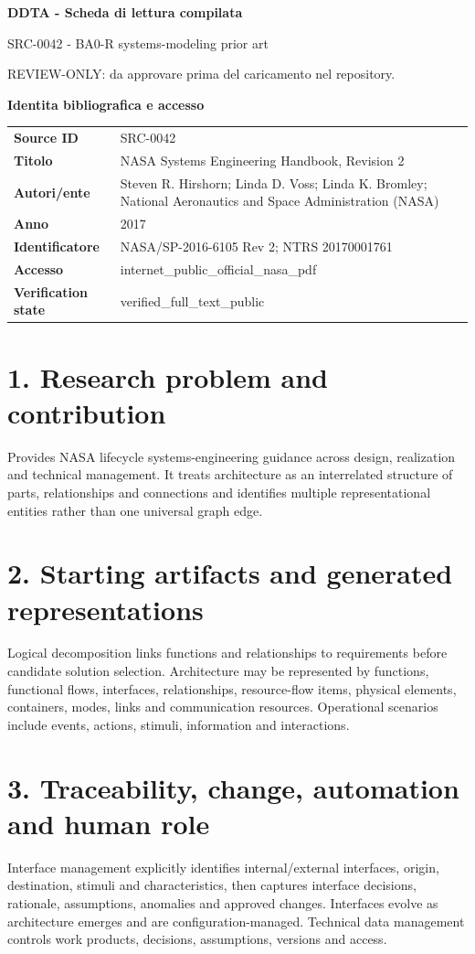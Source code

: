 \documentclass[10pt,a4paper]{article}
\newenvironment{factbox}[1]{\def\FrameCommand{\fcolorbox{ddtablue}{ddtagray}}\MakeFramed{\advance\hsize-2\width\FrameRestore}\noindent\textbf{#1}\par\smallskip}{\endMakeFramed}
\begin{document}
\begin{center}
{\LARGE\bfseries DDTA - Scheda di lettura compilata}\par
{\large SRC-0042 - BA0-R systems-modeling prior art}\par
{\small REVIEW-ONLY: da approvare prima del caricamento nel repository.}\par
\end{center}
\begin{factbox}{Identita bibliografica e accesso}
\begin{tabularx}{\linewidth}{>{\bfseries}p{3.4cm}X}
Source ID & SRC-0042\\
Titolo & NASA Systems Engineering Handbook, Revision 2\\
Autori/ente & Steven R. Hirshorn; Linda D. Voss; Linda K. Bromley; National Aeronautics and Space Administration (NASA)\\
Anno & 2017\\
Identificatore & NASA/SP-2016-6105 Rev 2; NTRS 20170001761\\
Accesso & internet\_public\_official\_nasa\_pdf\\
Verification state & verified\_full\_text\_public\\
\end{tabularx}
\end{factbox}
\section{1. Research problem and contribution}
Provides NASA lifecycle systems-engineering guidance across design, realization and technical management. It treats architecture as an interrelated structure of parts, relationships and connections and identifies multiple representational entities rather than one universal graph edge.
\section{2. Starting artifacts and generated representations}
Logical decomposition links functions and relationships to requirements before candidate solution selection. Architecture may be represented by functions, functional flows, interfaces, relationships, resource-flow items, physical elements, containers, modes, links and communication resources. Operational scenarios include events, actions, stimuli, information and interactions.
\section{3. Traceability, change, automation and human role}
Interface management explicitly identifies internal/external interfaces, origin, destination, stimuli and characteristics, then captures interface decisions, rationale, assumptions, anomalies and approved changes. Interfaces evolve as architecture emerges and are configuration-managed. Technical data management controls work products, decisions, assumptions, versions and access.
\end{document}
